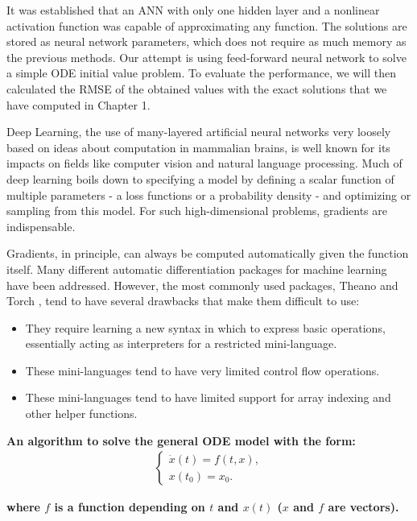 \documentclass[a4paper]{article}
\numberwithin{equation}{section}
\begin{document}
It was established that an ANN with only one hidden layer and a nonlinear activation function was capable of approximating any function. The solutions are stored as neural network parameters, which does not require as much memory as the previous methods. Our attempt is using feed-forward neural network to solve a simple ODE initial value problem. To evaluate the performance, we will then calculated the RMSE of the obtained values with the exact solutions that we have computed in Chapter 1.

Deep Learning, the use of many-layered artificial neural networks very loosely based on ideas about computation in mammalian brains, is well known for its impacts on fields like computer vision and natural language processing.
Much of deep learning boils down to specifying a model by defining a scalar function of multiple parameters - a loss functions or a probability density - and optimizing or sampling from this model.
For such high-dimensional problems, gradients are indispensable.

Gradients, in principle, can always be computed automatically given the function itself.
Many different automatic differentiation packages for machine learning have been addressed.
However, the most commonly used packages, Theano \cite{bastien2012theano} and Torch \cite{collobert2002torch}, tend to have several drawbacks that make them difficult to use:
\begin{itemize}
  \item They require learning a new syntax in which to express basic operations, essentially acting as interpreters for a restricted mini-language.
  \item These mini-languages tend to have very limited control flow operations.
  \item These mini-languages tend to have limited support for array indexing and other helper functions.
\end{itemize}

\textbf{An algorithm to solve the general ODE model with the form:}
\begin{align*}
  \begin{cases}
    \dot{x}(t) = f(t, x), \\
    x(t_0) = x_0.
  \end{cases}
\end{align*}

\textbf{where \(f\) is a function depending on \(t\) and \(x(t)\) (\(x\) and \(f\) are vectors).}
\end{document}
